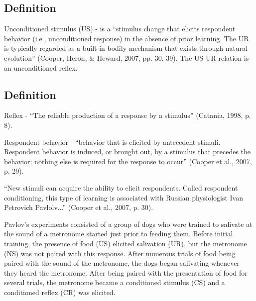 \subsection{Definition} 
Unconditioned stimulus (US) - is a ``stimulus change that elicits respondent behavior (i.e., unconditioned response) in the absence of prior learning.  The UR is typically regarded as a built-in bodily mechanism that exists through natural evolution'' (Cooper, Heron, \& Heward, 2007, pp. 30, 39).   The US-UR relation is an unconditioned reflex.
%
\subsection{Definition} 
Reflex - ``The reliable production of a response by a stimulus'' (Catania, 1998, p. 8).

Respondent behavior - ``behavior that is elicited by antecedent stimuli. Respondent behavior is induced, or brought out, by a stimulus that precedes the behavior; nothing else is required for the response to occur'' (Cooper et al., 2007, p. 29).

``New stimuli can acquire the ability to elicit respondents. Called respondent conditioning, this type of learning is associated with Russian physiologist Ivan Petrovich Pavlolv...'' (Cooper et al., 2007, p. 30).

Pavlov's experiments consisted of a group of dogs who were trained to salivate at the sound of a metronome started just prior to feeding them. Before initial training, the presence of food (US) elicited salivation (UR), but the metronome (NS) was not paired with this response. After numerous trials of food being paired with the sound of the metronome, the dogs began salivating whenever they heard the metronome. After being paired with the presentation of food for several trials, the metronome became a conditioned stimulus (CS) and a conditioned reflex (CR) was elicited. 

